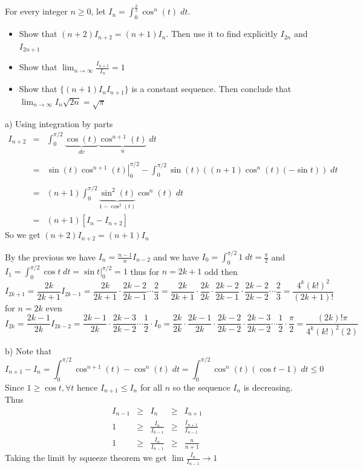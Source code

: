 \begin{problem}
For every integer $n\geq 0 $, let $I_n = \int_0^{\frac{\pi}{2}} \cos^n (t) \; dt$. 
    \begin{itemize}
        \item [(a)] Show that $(n+2)I_{n+2} = (n+1) I_n$. Then use it to find explicitly $I_{2n}$ and $I_{2n+1}$
        \item [(b)] Show that $\lim_{n\to \infty} \frac{I_{n+1}}{I_n} = 1 $
        \item [(c)] Show that $\{(n+1)I_nI_{n+1}\}$ is a constant sequence. Then conclude that $\lim_{n\to \infty} I_n \sqrt{2n}= \sqrt{\pi}$
    \end{itemize}
\begin{solution}
a) Using integration by parts 
    \[\begin{array}{rcl}
    \displaystyle I_{n+2} &=&  \displaystyle \int_0^{\pi/2} \underbrace{\cos(t)}_{dv}\underbrace{\cos^{n+1}(t)}_{u}\; dt \\ \\ &=&  \displaystyle \left.\sin(t)\cos^{n+1}(t)\right|_0^{\pi/2} - \int_0^{\pi/2} \sin(t)((n+1)\cos^n(t) (-\sin t))\; dt  \\ \\ 
     &=&  \displaystyle (n+1) \int_0^{\pi/2} \underbrace{\sin^2(t)}_{1-\cos^2(t)}\cos^n(t) \; dt \\ &=& (n+1)[ I_n - I_{n+2}]
    \end{array}\]
    So we get $(n+2)I_{n+2}=(n+1)I_n$\newline 

    By the previous we have $\displaystyle I_{n} = \frac{n-1}{n} I_{n-2}$
    and we have $I_0 = \int_0^{\pi/2} 1 \; dt = \frac{\pi}{2}$ and $I_1 = \int_0^{\pi/2} \cos t \; dt = \sin t|_0^{\pi/2} = 1 $ thus for $n=2k+1$ odd then 
    \[I_{2k+1} = \frac{2k}{2k+1} I_{2k-1} = \frac{2k}{2k+1}\cdot \frac{2k-2}{2k-1}\cdots \frac23  =\frac{2k}{2k+1}\cdot \frac{2k}{2k}\cdot \frac{2k-2}{2k-1}\cdot\frac{2k-2}{2k-2}\cdots \frac23 = \frac{4^k (k!)^2}{(2k+1)!} \]
    for $n=2k$ even 
    \[I_{2k} = \frac{2k-1}{2k} I_{2k-2} = \frac{2k-1}{2k} \cdot \frac{2k-3}{2k-2}\cdots \frac12 \cdot I_0 =\frac{2k}{2k} \cdot\frac{2k-1}{2k} \cdot \frac{2k-2}{2k-2}\cdot \frac{2k-3}{2k-2}\cdots \frac12 \cdot \frac{\pi}2=\frac{(2k)!\pi}{4^k (k!)^2 (2)}  \]

    b) Note that $$I_{n+1} - I_n = \int_0^{\pi/2} \cos^{n+1} (t) - \cos^n(t) \; dt = \int_0^{\pi/2} \cos^n(t) ( \cos t - 1)\; dt\leq 0 $$
    Since $1\geq \cos t, \forall t$ hence $I_{n+1}\leq I_n$ for all $n$ so the sequence $I_n$ is decreasing. Thus 
    $$\begin{array}{rcccl}
    \displaystyle I_{n-1} &\geq& \displaystyle I_n &\geq& I_{n+1} \\ 
     \displaystyle 1 &\geq& \displaystyle \frac{I_n}{I_{n-1}}&\geq& \displaystyle\frac{I_{n+1}}{I_{n-1}} \\ 
     1  &\geq& \frac{I_n}{I_{n-1}} &\geq& \frac{n}{n+1}
    \end{array}$$
    Taking the limit by squeeze theorem we get $\lim \frac{I_n}{I_{n-1}}\to 1$\newline 


\end{solution}
\end{problem}

